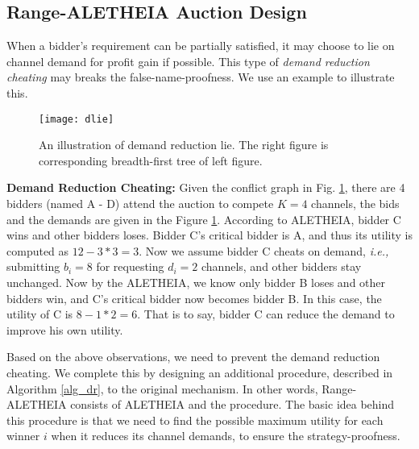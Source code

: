 \documentclass{sig-alternate}
\begin{document}


\subsection{Range-ALETHEIA Auction Design}

When a bidder's requirement can be partially satisfied, it may choose to lie on channel demand for profit gain if possible. This type of \emph{demand reduction cheating} \cite{Wiggans:IER:06} may breaks the false-name-proofness. We use an example to illustrate this.

\begin{figure}[!t]
\centering
\texttt{[image: dlie]}
\caption{An illustration of demand reduction lie. The right figure is corresponding breadth-first tree of left figure.}
\label{fig_dr}
\end{figure}

\textbf{Demand Reduction Cheating:} Given the conflict graph in Fig. \ref{fig_dr},  there are 4 bidders (named A - D) attend the auction to compete $K=4$ channels, the bids and the demands are given in the Figure \ref{fig_dr}. According to ALETHEIA, bidder C wins and other bidders loses. Bidder C's critical bidder is A, and thus its utility is computed as $12-3*3 = 3$. Now we assume bidder C cheats on demand, \emph{i.e.,} submitting $b_i=8$ for requesting $d_i=2$ channels, and other bidders stay unchanged. Now by the ALETHEIA, we know only bidder B loses and other bidders win, and C's critical bidder now becomes bidder B. In this case, the utility of C is $8-1*2 = 6$. That is to say, bidder C can reduce the demand to improve his own utility.

Based on the above observations, we need to prevent the demand reduction cheating. We complete this by designing an additional procedure, described in Algorithm \ref{alg_dr}, to the original mechanism. In other words, Range-ALETHEIA consists of ALETHEIA and the procedure. The basic idea behind this procedure is that we need to find the possible maximum utility for each winner $i$ when it reduces its channel demands, to ensure the strategy-proofness.
\end{document}
